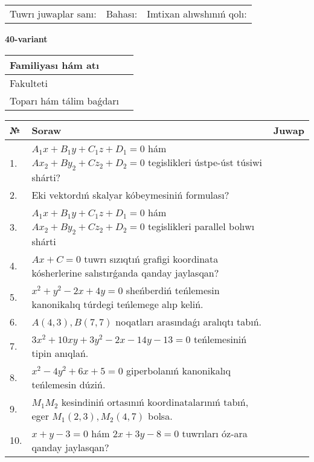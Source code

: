 \documentclass{article}
\begin{document}
\vspace{1cm}

\begin{tabular}{lll}
Tuwrı juwaplar sanı: \underline{\hspace{1.5cm}} & 
Bahası: \underline{\hspace{1.5cm}} & 
Imtixan alıwshınıń qolı: \underline{\hspace{2cm}} \\
\end{tabular}

\egroup

\newpage


\textbf{40-variant}\\

\bgroup
\def\arraystretch{1.6} %

\begin{tabular}{|m{5.7cm}|m{9.5cm}|}
\hline
Familiyası hám atı & \\
\hline
Fakulteti  & \\
\hline
Toparı hám tálim baǵdarı  & \\
\hline
\end{tabular}

\vspace{1cm}

\begin{tabular}{|m{0.7cm}|m{10cm}|m{4cm}|}
\hline
№ & Soraw & Juwap \\
\hline
1. & $A_1x+B_1y+C_1z+D_1=0$ hám $Ax_2+By_2+Cz_2+D_2=0$ tegislikleri ústpe-úst túsiwi shárti? &  \\
\hline
2. & Eki vektordıń skalyar kóbeymesiniń formulası? &  \\
\hline
3. & $A_1x+B_1y+C_1z+D_1=0$ hám $Ax_2+By_2+Cz_2+D_2=0$ tegislikleri parallel bolıwı shárti &  \\
\hline
4. & $Ax+C=0$ tuwrı sızıqtıń grafigi koordinata kósherlerine salıstırǵanda qanday jaylasqan? &  \\
\hline
5. & $x^{2}+y^{2}-2x+4y=0$ sheńberdiń teńlemesin kanonikalıq túrdegi teńlemege alıp keliń. &  \\
\hline
6. & $A(4, 3), B(7, 7)$ noqatları arasındaǵı aralıqtı tabıń. &  \\
\hline
7. & $3x^{2}+10xy+3y^{2}-2x-14y-13=0$ teńlemesiniń tipin anıqlań. &  \\
\hline
8. & $x^{2}-4y^{2}+6x+5=0$ giperbolanıń kanonikalıq teńlemesin dúziń. &  \\
\hline
9. & $M_{1}M_{2}$ kesindiniń ortasınıń koordinatalarınıń tabıń, eger $M_{1} (2, 3), M_{2} (4, 7)$ bolsa. &  \\
\hline
10. & $x+y-3=0$ hám $2x+3y-8=0$ tuwrıları óz-ara qanday jaylasqan? &  \\
\hline
\end{tabular}
\end{document}
